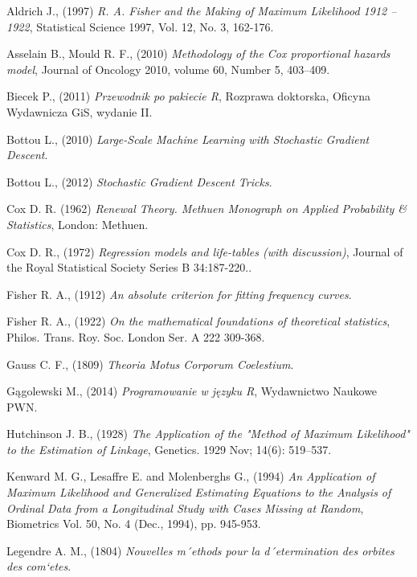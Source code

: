 \begin{thebibliography}{99}

 Aldrich J., (1997) \textit{R. A. Fisher and the Making of Maximum Likelihood 1912 – 1922}, Statistical Science
1997, Vol. 12, No. 3, 162-176.

 Asselain B., Mould R. F., (2010) \textit{Methodology of the Cox proportional hazards model},  Journal of Oncology 2010, volume 60, Number 5,  403–409.

 Biecek P., (2011) \textit{Przewodnik po pakiecie R}, Rozprawa doktorska, Oficyna Wydawnicza GiS, wydanie II.

 Bottou L., (2010) \textit{Large-Scale Machine Learning with Stochastic Gradient Descent}.

 Bottou L., (2012) \textit{Stochastic Gradient Descent Tricks}.

 Cox D. R. (1962) \textit{Renewal Theory. Methuen Monograph on Applied Probability
\& Statistics}, London: Methuen.

  Cox D. R., (1972) \textit{Regression models and life-tables (with discussion)}, Journal of the Royal Statistical Society Series B 34:187-220.. 



 Fisher R. A., (1912) \textit{An absolute criterion for fitting frequency curves}. 

 Fisher R. A., (1922) \textit{On the mathematical foundations of theoretical statistics}, Philos. Trans. Roy. Soc. London Ser. A 222 309-368.


 Gauss C. F., (1809) \textit{Theoria Motus Corporum Coelestium}.

 Gągolewski M., (2014) \textit{Programowanie w języku R}, Wydawnictwo Naukowe PWN.


 Hutchinson J. B., (1928) \textit{The Application of the "Method of Maximum Likelihood" to the Estimation of Linkage}, Genetics. 1929 Nov; 14(6): 519–537.


 Kenward M. G., Lesaffre E. and Molenberghs G., (1994) \textit{An Application of Maximum Likelihood and Generalized Estimating Equations to the Analysis of Ordinal Data from a Longitudinal Study with Cases Missing at Random}, Biometrics
Vol. 50, No. 4 (Dec., 1994), pp. 945-953.

 Legendre A. M., (1804) \textit{Nouvelles m´ethods pour la d´etermination des orbites des com`etes}.


\end{thebibliography}
